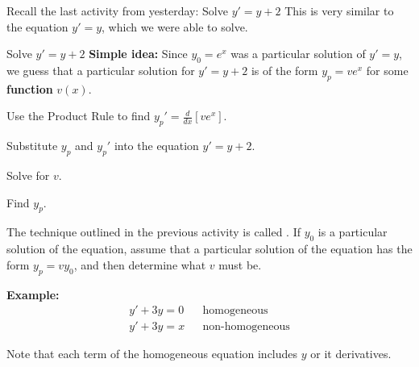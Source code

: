 
\begin{applicationActivities}

\begin{observation}
Recall the last activity from yesterday:
\vfill
Solve \(y'=y+2\)
\vfill
This is very similar to the equation \(y'=y\), which we were able to solve.
\end{observation}

\begin{activity}{15}
Solve \(y'=y+2\)
\vfill
\textbf{Simple idea:} Since \(y_0=e^x\) was a particular solution of \(y'=y\), 
we guess that a particular solution for \(y'=y+2\) is of the form \(y_p =  v e^x\) 
for some \textbf{function} \(v(x)\). 
\begin{subactivity}
Use the Product Rule to find \(y_p'=\frac{d}{dx}[ve^x]\).
\end{subactivity}
\begin{subactivity}
Substitute \(y_p\) and \(y_p'\) into the equation \(y'=y+2\).
\end{subactivity}
\begin{subactivity}
Solve for \(v\).
\end{subactivity}
\begin{subactivity}
Find \(y_p\).
\end{subactivity}
\end{activity}

\begin{observation}
The technique outlined in the previous activity is called .  
If \(y_0\) is a particular solution of the  equation, 
assume that a particular solution of the 
 equation has the form \(y_p = v y_0\), and then determine what \(v\) must be. 

\vfill

\textbf{Example: }
\begin{align*}
y'+3y = 0 & & \text{homogeneous} \\
y'+3y = x & & \text{non-homogeneous}
\end{align*}

Note that each term of the homogeneous equation includes \(y\) or it derivatives.
\end{observation}


\end{applicationActivities}
